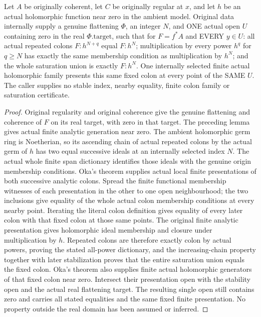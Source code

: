 \begin{theorem}
\label{hir:real-domain-original-exact-uniform-saturation}
\leanok
Let $A$ be originally coherent, let $C$ be originally regular at $x$,
and let $h$ be an actual holomorphic function near zero in the ambient
model. Original data internally supply a genuine flattening $\Phi$,
an integer $N$, and ONE actual open $U$ containing zero in the real
$\Phi.\mathrm{target}$, such that for $F=f^*A$ and EVERY $y\in U$:
all actual repeated colons $F:h^{N+q}$ equal $F:h^N$; multiplication
by every power $h^q$ for $q\geq N$ has exactly the same membership
condition as multiplication by $h^N$; and the whole saturation union
is exactly $F:h^N$. One internally selected finite actual holomorphic
family presents this same fixed colon at every point of the SAME $U$.
The caller supplies no stable index, nearby equality, finite colon
family or saturation certificate.
\end{theorem}
\begin{proof}
Original regularity and original coherence give the genuine flattening
and coherence of $F$ on its real target, with zero in that target.
The preceding lemma gives actual finite analytic generation near zero.
The ambient holomorphic germ ring is Noetherian, so its ascending chain
of actual repeated colons by the actual germ of $h$ has two equal
successive ideals at an internally selected index $N$. The actual
whole finite span dictionary identifies those ideals with the genuine
origin membership conditions. Oka's theorem supplies actual local
finite presentations of both successive analytic colons. Spread the
finite functional membership witnesses of each presentation in the
other to one open neighbourhood; the two inclusions give equality of
the whole actual colon membership conditions at every nearby point.
Iterating the literal colon definition gives equality of every later
colon with that fixed colon at those same points. The original finite
analytic presentation gives holomorphic ideal membership and closure
under multiplication by $h$. Repeated colons are therefore exactly
colon by actual powers, proving the stated all-power dictionary, and
the increasing-chain property together with later stabilization proves
that the entire saturation union equals the fixed colon.
Oka's theorem also supplies finite actual holomorphic generators of
that fixed colon near zero. Intersect their presentation open with the
stability open and the actual real flattening target. The resulting
single open still contains zero and carries all stated equalities and
the same fixed finite presentation. No property outside the real
domain has been assumed or inferred.
\end{proof}
